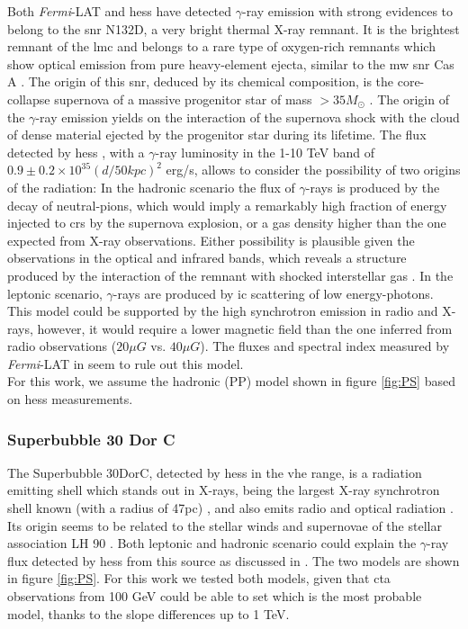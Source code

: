 \documentclass[main.tex]{subfiles}
\begin{document}
Both \textit{Fermi}-LAT and \gls{hess} have detected $\gamma$-ray emission with strong evidences to belong to the \gls{snr} N132D, a very bright thermal X-ray remnant. It is the brightest remnant of the \gls{lmc} and belongs to a rare type of oxygen-rich remnants which show optical emission from pure heavy-element ejecta, similar to the \gls{mw} \gls{snr} Cas A \cite{2007N132D}. The origin of this \gls{snr}, deduced by its chemical composition, is the core-collapse supernova of a massive progenitor star of mass $> 35 M_{\odot}$ \cite{2007N132D}. The origin of the $\gamma$-ray emission yields on the interaction of the supernova shock with the cloud of dense material ejected by the progenitor star during its lifetime. The flux detected by \gls{hess} \cite{2015HESSTeVLMC}, with a $\gamma$-ray luminosity in the 1-10 TeV band of $0.9 \pm 0.2 \times 10^{35}(d/50kpc)^2$ erg/s, allows to consider the possibility of two origins of the radiation: In the hadronic scenario the flux of $\gamma$-rays is produced by the decay of neutral-pions, which would imply a remarkably high fraction of energy injected to \glspl{cr} by the supernova explosion, or a gas density higher than the one expected from X-ray observations. Either possibility is plausible given the observations in the optical and infrared bands, which reveals a structure produced by the interaction of the remnant with shocked interstellar gas \cite{2006shockn132D}. In the leptonic scenario, $\gamma$-rays are produced by \gls{ic} scattering of low energy-photons. This model could be supported by the high synchrotron emission in radio and X-rays, however, it would require a lower magnetic field than the one inferred from radio observations ($20 \mu G$ vs. $40\mu G$). The fluxes and spectral index measured by \textit{Fermi}-LAT in \cite{2016LMCFermiLAT} seem to rule out this model.\\
For this work, we assume the hadronic (PP) model shown in figure \ref{fig:PS} based on \gls{hess} measurements.


\subsubsection{Superbubble 30 Dor C}

The Superbubble 30DorC, detected by \gls{hess} in the \gls{vhe} range, is a radiation emitting shell which stands out in X-rays, being the largest X-ray synchrotron shell known (with a radius of 47pc) \cite{200430dorcxrays}, and also emits radio and optical radiation \cite{1985SNRsintheLMC30dorc}. Its origin seems to be related to the stellar winds and supernovae of the stellar association LH 90 \cite{198430dorLH90}. Both leptonic and hadronic scenario could explain the $\gamma$-ray flux detected by \gls{hess} from this source as discussed in \cite{2015HESSTeVLMC}. The two models are shown in figure \ref{fig:PS}. For this work we tested both models, given that \gls{cta} observations from 100 GeV could be able to set which is the most probable model, thanks to the slope differences up to 1 TeV.
\end{document}
